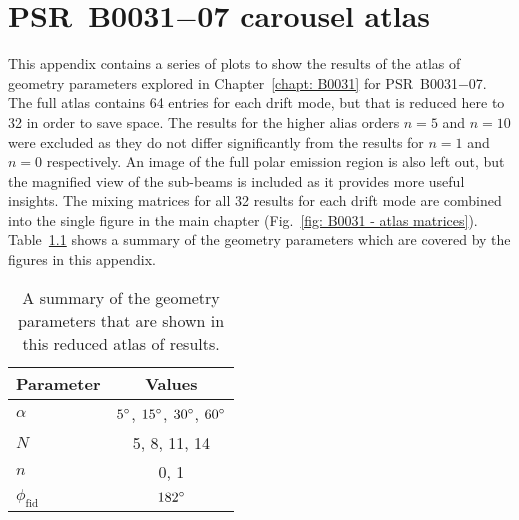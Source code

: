 
\chapter{\texorpdfstring{PSR~B0031$-$07}{PSR~B0031--07} carousel atlas} %
\label{app: atlas results}


This appendix contains a series of plots to show the results of the atlas of geometry parameters explored in Chapter~\ref{chapt: B0031} for PSR~B0031$-$07. The full atlas contains 64 entries for each drift mode, but that is reduced here to 32 in order to save space. The results for the higher alias orders $n=5$ and $n=10$ were excluded as they do not differ significantly from the results for $n=1$ and $n=0$ respectively. An image of the full polar emission region is also left out, but the magnified view of the sub-beams is included as it provides more useful insights. The mixing matrices for all 32 results for each drift mode are combined into the single figure in the main chapter (Fig.~\ref{fig: B0031 - atlas matrices}). Table~\ref{tab: appendix atlas parameters} shows a summary of the geometry parameters which are covered by the figures in this appendix.
\begin{table}[H] %
    \centering
    \caption[Parameters of the reduced atlas]{A summary of the geometry parameters that are shown in this reduced atlas of results.}
    \label{tab: appendix atlas parameters}
    \begin{tabular}{lc}
        \hline
        Parameter & Values  \\
        \hline
        $\alpha$ & $5^\circ$, $15^\circ$, $30^\circ$, $60^\circ$ \\
        $N$ & 5, 8, 11, 14 \\
        $n$ & 0, 1 \\
        $\phi_\mathrm{fid}$ & $182^\circ$ 
    \end{tabular}
\end{table}



